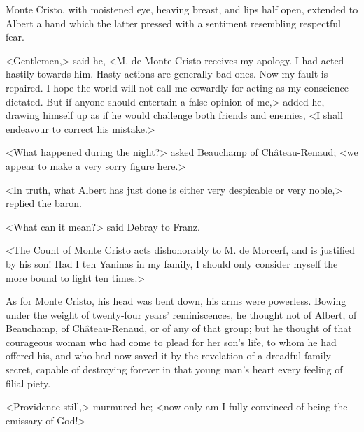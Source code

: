  Monte Cristo, with moistened eye, heaving breast, and lips half open, extended to Albert a hand which the latter pressed with a sentiment resembling respectful fear. 

 <Gentlemen,> said he, <M. de Monte Cristo receives my apology. I had acted hastily towards him. Hasty actions are generally bad ones. Now my fault is repaired. I hope the world will not call me cowardly for acting as my conscience dictated. But if anyone should entertain a false opinion of me,> added he, drawing himself up as if he would challenge both friends and enemies, <I shall endeavour to correct his mistake.> 

 <What happened during the night?> asked Beauchamp of Château-Renaud; <we appear to make a very sorry figure here.> 

 <In truth, what Albert has just done is either very despicable or very noble,> replied the baron. 

 <What can it mean?> said Debray to Franz. 

 <The Count of Monte Cristo acts dishonorably to M. de Morcerf, and is justified by his son! Had I ten Yaninas in my family, I should only consider myself the more bound to fight ten times.> 

 As for Monte Cristo, his head was bent down, his arms were powerless. Bowing under the weight of twenty-four years' reminiscences, he thought not of Albert, of Beauchamp, of Château-Renaud, or of any of that group; but he thought of that courageous woman who had come to plead for her son's life, to whom he had offered his, and who had now saved it by the revelation of a dreadful family secret, capable of destroying forever in that young man's heart every feeling of filial piety. 

 <Providence still,> murmured he; <now only am I fully convinced of being the emissary of God!> 